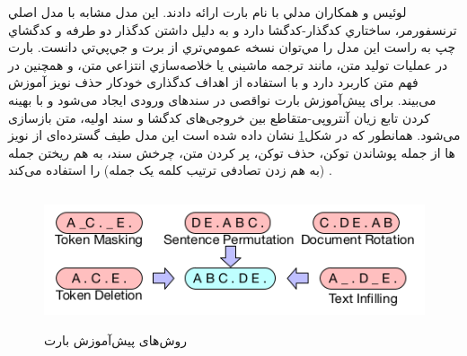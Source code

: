 





لوئيس و همكاران مدلي با نام بارت 
ارائه دادند. اين مدل مشابه با مدل اصلي ترنسفورمر، ساختاري كدگذار-کدگشا دارد و به دليل داشتن كدگذار دو طرفه و كدگشاي چپ به راست اين مدل را مي‌توان نسخه عمومي‌تري از برت و جي‌پي‌تي 
 دانست. بارت در عمليات توليد متن، مانند ترجمه ماشيني يا خلاصه‌سازي انتزاعي متن، و همچنين در فهم متن كاربرد دارد و با استفاده از اهداف کدگذاری خودکار حذف نویز آموزش می‌بیند. برای پیش‌آموزش بارت نواقصی در سندهای ورودی ایجاد می‌شود و با بهینه کردن تابع زیان آنتروپی-متقاطع 
 بین خروجی‌های کدگشا و سند اولیه، متن بازسازی می‌شود. همانطور که در شکل\ref{fig:bart} نشان داده شده است این مدل طیف گسترده‌ای از نویز ‌ها از جمله پوشاندن توکن، حذف توکن، پر کردن متن، چرخش سند، به هم ریختن جمله (به هم زدن تصادفی ترتیب کلمه یک جمله) را استفاده می‌کند \cite{lewis-etal-2020-bart}. 
\begin{figure}[!h]
	\begin{center}
		\includegraphics[height=4cm]{bart2.png}
	\end{center}
	\caption{ روش‌های پیش‌آموزش بارت \cite{lewis-etal-2020-bart}}
	\label{fig:bart}
	\medskip
	\small
\end{figure}


